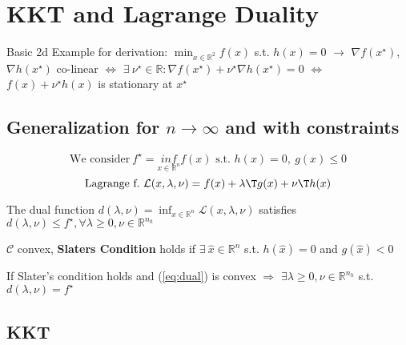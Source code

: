 \section{KKT and Lagrange Duality}

Basic 2d Example for derivation:
$\min _{x \in \mathbb{R}^2} f(x)$ s.t. $h(x)=0$
$\rightarrow$
$\nabla f(x^\star)$, $\nabla h(x^\star)$
co-linear
$\Leftrightarrow$
$\exists\ \nu^\star \in \mathbb{R}: \nabla f(x^\star)+\nu^\star\nabla h(x^\star) = 0$
$\Leftrightarrow$
$f(x)+\nu^\star h(x)$ is stationary at $x^\star$

\subsection{Generalization for $n\rightarrow\infty$ and with constraints}
\vspace{-6mm}
\begin{equation}
	\text{We consider}\
	f^\star = \underset{x \in \mathcal{\mathbb{R}}^n}{inf}f(x) \text{ s.t. } h(x)=0,\ g(x) \le 0
	\label{eq:dual}
\end{equation}
\vspace{-4mm}
\begin{equation}
	\text{Lagrange f.}\
	\mathcal{L}(x,\lambda,\nu) = f(x) + \lambda\T g(x)+\nu\T h(x)
\end{equation}

\begin{proposition}
	The dual function
	$d(\lambda,\nu) = \inf_{x \in \mathcal{\mathbb{R}}^n}\mathcal{L}(x,\lambda,\nu)$
	satisfies
	$d(\lambda,\nu)\le f^\star,\forall \lambda\ge 0,\nu \in \mathbb{R}^{n_h}$
\end{proposition}

\begin{definition}
	$\mathcal{C}$ convex, \textbf{Slaters Condition} holds if
	$\exists\ \hat{x} \in \mathbb{R}^{n}$ s.t. $h(\hat{x})=0$ and $g(\hat{x})<0$
\end{definition}

\begin{proposition}
	If Slater's condition holds
	and (\ref{eq:dual}) is convex
	$\Rightarrow$
	$\exists \lambda \ge 0, \nu \in \mathbb{R}^{n_h}$ s.t. $d(\lambda,\nu)=f^\star$
\end{proposition}

\subsection{KKT} %

